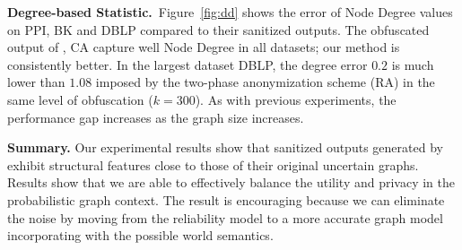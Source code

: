 \textbf{Degree-based Statistic.}~Figure~\ref{fig:dd} shows the error of Node Degree values on PPI, BK and DBLP compared to their sanitized outputs. 
The obfuscated output of {\methodName}, CA capture well Node Degree in all datasets; 
our method {\methodName} is consistently better.    
In the largest dataset DBLP, the degree error $0.2$ is much lower than $1.08$ imposed by the two-phase anonymization scheme (RA) in the same level of obfuscation ($k=300$).  
As with previous experiments, the performance gap increases as the graph size increases.

\textbf{Summary.} 
Our experimental results show that sanitized outputs generated by {\methodName} exhibit structural features close to those of their original uncertain graphs. 
Results show that we are able to effectively balance the utility and privacy in the probabilistic graph context.
The result is encouraging because we can eliminate the noise by moving from the reliability model to a more accurate graph model incorporating with the possible world semantics.